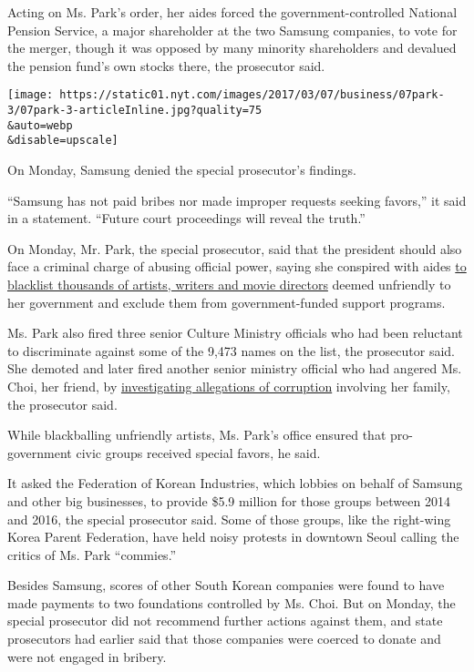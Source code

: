 Acting on Ms. Park's order, her aides forced the government-controlled
National Pension Service, a major shareholder at the two Samsung
companies, to vote for the merger, though it was opposed by many
minority shareholders and devalued the pension fund's own stocks there,
the prosecutor said.

\texttt{[image: https://static01.nyt.com/images/2017/03/07/business/07park-3/07park-3-articleInline.jpg?quality=75\\\&auto=webp\\\&disable=upscale]}

On Monday, Samsung denied the special prosecutor's findings.

``Samsung has not paid bribes nor made improper requests seeking
favors,'' it said in a statement. ``Future court proceedings will reveal
the truth.''

On Monday, Mr. Park, the special prosecutor, said that the president
should also face a criminal charge of abusing official power, saying she
conspired with aides
\href{https://www.nytimes.com/2017/01/12/world/asia/south-korea-president-park-blacklist-artists.html}{to
blacklist thousands of artists, writers and movie directors} deemed
unfriendly to her government and exclude them from government-funded
support programs.

Ms. Park also fired three senior Culture Ministry officials who had been
reluctant to discriminate against some of the 9,473 names on the list,
the prosecutor said. She demoted and later fired another senior ministry
official who had angered Ms. Choi, her friend, by
\href{https://www.nytimes.com/2016/11/12/world/asia/south-korea-park-geun-hye.html}{investigating
allegations of corruption} involving her family, the prosecutor said.

While blackballing unfriendly artists, Ms. Park's office ensured that
pro-government civic groups received special favors, he said.

It asked the Federation of Korean Industries, which lobbies on behalf of
Samsung and other big businesses, to provide \$5.9 million for those
groups between 2014 and 2016, the special prosecutor said. Some of those
groups, like the right-wing Korea Parent Federation, have held noisy
protests in downtown Seoul calling the critics of Ms. Park ``commies.''

Besides Samsung, scores of other South Korean companies were found to
have made payments to two foundations controlled by Ms. Choi. But on
Monday, the special prosecutor did not recommend further actions against
them, and state prosecutors had earlier said that those companies were
coerced to donate and were not engaged in bribery.

